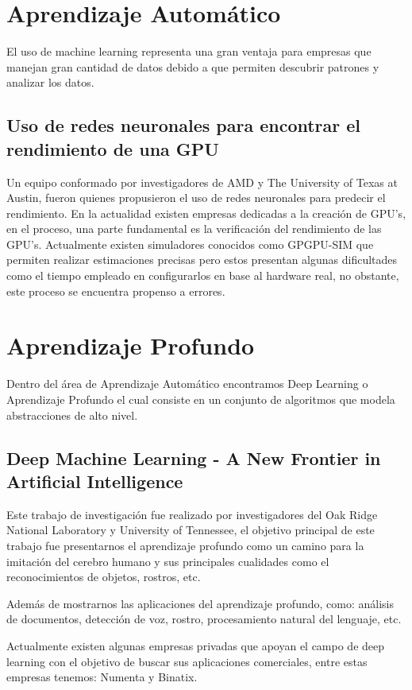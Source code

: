 \section{Aprendizaje Automático}
El uso de machine learning representa una gran ventaja para empresas que manejan gran cantidad de datos debido a que permiten descubrir patrones y analizar los datos.

\subsection{Uso de redes neuronales para encontrar el rendimiento de una GPU}
Un equipo conformado por investigadores de AMD y The University of Texas at Austin, fueron quienes propusieron el uso de redes neuronales para predecir el rendimiento.
En la actualidad existen empresas dedicadas a la creación de GPU's, en el proceso, una parte fundamental es la verificación del rendimiento de las GPU's. Actualmente existen simuladores conocidos como GPGPU-SIM que permiten realizar estimaciones precisas pero estos presentan algunas dificultades como el tiempo empleado en configurarlos en base al hardware real, no obstante, este proceso se encuentra propenso a errores. 
\section{Aprendizaje Profundo}
Dentro del área de Aprendizaje Automático encontramos Deep Learning o Aprendizaje Profundo el cual consiste en un conjunto de algoritmos que modela abstracciones de alto nivel.

\subsection{Deep Machine Learning - A New Frontier in Artificial Intelligence}
Este trabajo de investigación fue realizado por investigadores del Oak Ridge National Laboratory y University of Tennessee, el objetivo principal de este trabajo fue presentarnos el aprendizaje profundo como un camino para la imitación del cerebro humano y sus principales cualidades como el reconocimientos de objetos, rostros, etc.

Además de mostrarnos las aplicaciones del aprendizaje profundo, como: análisis de documentos, detección de voz, rostro, procesamiento natural del lenguaje, etc.

Actualmente existen algunas empresas privadas que apoyan el campo de deep learning con el objetivo de buscar sus aplicaciones comerciales, entre estas empresas tenemos: Numenta y Binatix.
